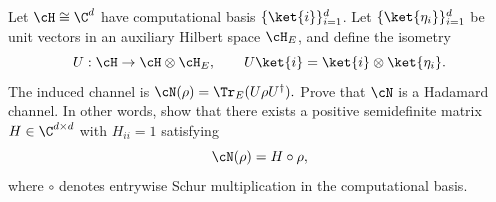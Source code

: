 Let $\cH\cong\C^d$ have computational basis $\{\ket{i}\}_{i=1}^d$. Let $\{\ket{\eta_i}\}_{i=1}^d$ be unit vectors in an auxiliary Hilbert space $\cH_E$, and define the isometry
$$
U:\cH\to\cH\otimes\cH_E,
\qquad
U\ket{i}=\ket{i}\otimes\ket{\eta_i}.
$$
The induced channel is $\cN(\rho)=\Tr_E(U\rho U^\dagger).$
Prove that $\cN$ is a Hadamard channel. In other words, show that there exists a positive semidefinite matrix $H\in\C^{d\times d}$ with $H_{ii}=1$ satisfying
$$
\cN(\rho)=H\circ\rho,
$$
where $\circ$ denotes entrywise Schur multiplication in the computational basis.
